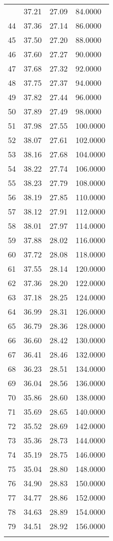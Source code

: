 \documentclass[
  captions=tableheading,
]{scrartcl}
\begin{document}
\begin{longtable} {l|l|l|l}
{43	& 37.21	& 27.09	& 84.0000\\
44	& 37.36	& 27.14	& 86.0000\\
45	& 37.50	& 27.20	& 88.0000\\
46	& 37.60	& 27.27	& 90.0000\\
47	& 37.68	& 27.32	& 92.0000\\
48	& 37.75	& 27.37	& 94.0000\\
49	& 37.82	& 27.44	& 96.0000\\
50	& 37.89	& 27.49	& 98.0000\\
51	& 37.98	& 27.55	& 100.0000\\
52	& 38.07	& 27.61	& 102.0000\\
53	& 38.16	& 27.68	& 104.0000\\
54	& 38.22	& 27.74	& 106.0000\\
55	& 38.23	& 27.79	& 108.0000\\
56	& 38.19	& 27.85	& 110.0000\\
57	& 38.12	& 27.91	& 112.0000\\
58	& 38.01	& 27.97	& 114.0000\\
59	& 37.88	& 28.02	& 116.0000\\
60	& 37.72	& 28.08	& 118.0000\\
61	& 37.55	& 28.14	& 120.0000\\
62	& 37.36	& 28.20	& 122.0000\\
63	& 37.18	& 28.25	& 124.0000\\
64	& 36.99	& 28.31	& 126.0000\\
65	& 36.79	& 28.36	& 128.0000\\
66	& 36.60	& 28.42	& 130.0000\\
67	& 36.41	& 28.46	& 132.0000\\
68	& 36.23	& 28.51	& 134.0000\\
69	& 36.04	& 28.56	& 136.0000\\
70	& 35.86	& 28.60	& 138.0000\\
71	& 35.69	& 28.65	& 140.0000\\
72	& 35.52	& 28.69	& 142.0000\\
73	& 35.36	& 28.73	& 144.0000\\
74	& 35.19	& 28.75	& 146.0000\\
75	& 35.04	& 28.80	& 148.0000\\
76	& 34.90	& 28.83	& 150.0000\\
77	& 34.77	& 28.86	& 152.0000\\
78	& 34.63	& 28.89	& 154.0000\\
79	& 34.51	& 28.92	& 156.0000\\
}
\end{longtable}
\end{document}
